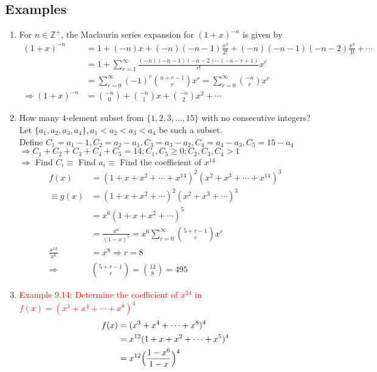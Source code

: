 \documentclass[a4paper]{article}
\begin{document}
\subsection*{Examples}
\begin{enumerate}
    \item For $n\in\mathbb{Z}^+$, the Maclaurin series expansion for $(1+x)^{-n}$ is given by
    \begin{align*}
        (1+x)^{-n}&=1+(-n)x+(-n)(-n-1)\frac{x^2}{2!}+(-n)(-n-1)(-n-2)\frac{x^3}{3!}+\cdots\\
        &=1+\sum_{r=1}^{\infty}{\frac{(-n)(-n-1)(-n-2)\cdots(-n-r+1)}{r!}x^r}\\
        &=\sum_{r=0}^{\infty}{(-1)^r\binom{n+r-1}{r} x^r}=\sum_{r=0}^{\infty}{\binom{-n}{r}x^r}\\
        \Rightarrow(1+x)^{-n}&=\binom{-n}{0}+\binom{-n}{1}x+\binom{-n}{2}x^2+\cdots
    \end{align*}
    \item How many 4-element subset from $\{1,2,3,\ldots,15\}$ with no consecutive integers?\\
    Let $\{a_1,a_2,a_3,a_4\}, a_1<a_2<a_3<a_4$ be such a subset.\\
    Define $C_1=a_1-1,C_2=a_2-a_1,C_3=a_3-a_2,C_4=a_4-a_3,C_5=15-a_4$\\
    $\Rightarrow C_1+C_2+C_3+C_4+C_5=14;C_1,C_5\geq 0; C_2,C_3,C_4>1$\\
    $\Rightarrow$ Find $C_i \equiv$ Find $a_i \equiv$ Find the coefficient of $x^{14}$
    \begin{align*}
    f(x)&=(1+x+x^2+\cdots+x^{14})^2(x^2+x^3+\cdots+x^{14})^3\\
    \equiv g(x)&=(1+x+x^2+\cdots)^2(x^2+x^3+\cdots)^3\\
    &=x^6(1+x+x^2+\cdots)^5\\
    &=\frac{x^6}{(1-x)^5}=x^6\sum_{r=0}^{\infty}{\binom{5+r-1}{r}x^r}\\
    \frac{x^{14}}{x^6}&=x^8\Rightarrow r=8\\
    \Rightarrow&\binom{5+r-1}{r}=\binom{12}{8}=495
    \end{align*}
    \item \textcolor{red}{Example 9.14: Determine the coefficient of $x^{24}$ in $f(x)=(x^3+x^4+\cdots+x^8)^4$}
    \begin{align*}
        f(x)&=(x^3+x^4+\cdots+x^8)^4\\
        &=x^{12}(1+x+x^2+\cdots+x^5)^4\\
        &=x^{12}\Bigl(\frac{1-x^6}{1-x}\Bigr)^4

\end{align*}
\end{enumerate}
\end{document}

